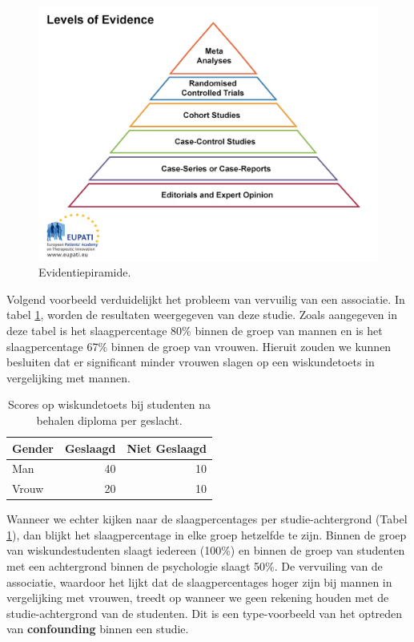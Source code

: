 \documentclass[
]{book}
\theoremstyle{definition}
\theoremstyle{definition}
\theoremstyle{definition}
\theoremstyle{definition}
\theoremstyle{remark}
\begin{document}
\begin{figure}
\includegraphics[width=1\linewidth]{img/evidenceladder} \caption{Evidentiepiramide.}\label{fig:evidenceladder}
\end{figure}

Volgend voorbeeld verduidelijkt het probleem van vervuilig van een associatie. In tabel \ref{tab:aggr}, worden de resultaten weergegeven van deze studie. Zoals aangegeven in deze tabel is het slaagpercentage 80\% binnen de groep van mannen en is het slaagpercentage 67\% binnen de groep van vrouwen. Hieruit zouden we kunnen besluiten dat er significant minder vrouwen slagen op een wiskundetoets in vergelijking met mannen.

\begin{table}

\caption{\label{tab:aggr}Scores op wiskundetoets bij studenten na behalen diploma per geslacht.}
\centering
\begin{tabular}[t]{lrr}
\toprule
Gender & Geslaagd & Niet Geslaagd\\
\midrule
Man & 40 & 10\\
Vrouw & 20 & 10\\
\bottomrule
\end{tabular}
\end{table}

Wanneer we echter kijken naar de slaagpercentages per studie-achtergrond (Tabel \ref{tab:aggr}), dan blijkt het slaagpercentage in elke groep hetzelfde te zijn. Binnen de groep van wiskundestudenten slaagt iedereen (100\%) en binnen de groep van studenten met een achtergrond binnen de psychologie slaagt 50\%. De vervuiling van de associatie, waardoor het lijkt dat de slaagpercentages hoger zijn bij mannen in vergelijking met vrouwen, treedt op wanneer we geen rekening houden met de studie-achtergrond van de studenten. Dit is een type-voorbeeld van het optreden van \textbf{confounding} binnen een studie.
\end{document}
